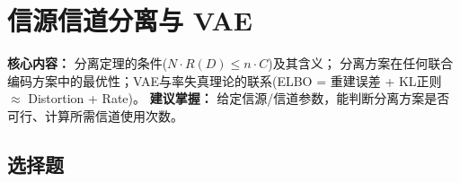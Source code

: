 \documentclass[12pt,a4paper]{ctexart}
\begin{document}
\newpage

\section{信源信道分离与 VAE}

\begin{notetested}
\textbf{核心内容：} 分离定理的条件($N \cdot R(D) \leq n \cdot C$)及其含义；
分离方案在任何联合编码方案中的最优性；VAE与率失真理论的联系(ELBO = 重建误差 + KL正则 $\approx$ Distortion + Rate)。
\textbf{建议掌握：} 给定信源/信道参数，能判断分离方案是否可行、计算所需信道使用次数。
\end{notetested}

\subsection*{选择题}
\end{document}
